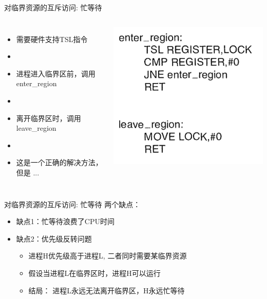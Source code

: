 \documentclass[xcolor=svgnames]{beamer}
\begin{document}
\begin{CJK*}{UTF8}{gbsn}
\begin{frame}{对临界资源的互斥访问: 忙等待}
\begin{columns}%
\begin{itemize}
\item 需要硬件支持TSL指令
\item[]
\item 进程进入临界区前，调用enter\_region
\item[]
\item 离开临界区时，调用leave\_region
\item[]
\item 这是一个正确的解决方法，但是 ...
\end{itemize}
\includegraphics[width=1.0\textwidth]{tsl.png}
\end{columns}%
\end{frame}

\begin{frame}{对临界资源的互斥访问: 忙等待}
两个缺点：

\begin{itemize}
\item 缺点1：忙等待浪费了CPU时间
\item 缺点2：优先级反转问题
\begin{itemize}
\item 进程H优先级高于进程L, 二者同时需要某临界资源
\item 假设当进程L在临界区时，进程H可以运行
\item 结局： 进程L永远无法离开临界区，H永远忙等待
\end{itemize}
\end{itemize}


\end{frame}
\end{CJK*}
\end{document}
